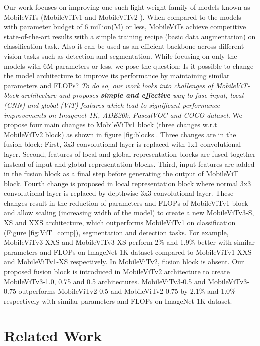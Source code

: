 \documentclass{article} \usepackage{iclr2022_conference,times}
\begin{document}
Our work focuses on improving one such light-weight family of models known as MobileViTs (MobileViTv1 \citep{mehta2021mobilevit} and MobileViTv2 \citep{mehta2022mobilevit}).
When compared to the models with parameter budget of 6 million(M) or less, MobileViTs achieve competitive state-of-the-art results with a simple training recipe (basic data augmentation) on classification task.
Also it can be used as an efficient backbone across different vision tasks such as detection and segmentation.
While focusing on only the models with 6M parameters or less, we pose the question:
Is it possible to change the model architecture to improve its performance by maintaining similar parameters and FLOPs?
\textit{To do so, our work looks into challenges of MobileViT-block architecture and proposes \textbf{simple and effective} way to fuse input, local (CNN) and global (ViT) features which lead to significant performance improvements on Imagenet-1K, ADE20k, PascalVOC and COCO dataset}. 
We propose four main changes to MobileViTv1 block (three changes w.r.t MobileViTv2 block) as shown in figure \ref{fig:blocks}.
Three changes are in the fusion block:
First, 3x3 convolutional layer is replaced with 1x1 convolutional layer.
Second, features of local and global representation blocks are fused together instead of input and global representation blocks. 
Third, input features are added in the fusion block as a final step before generating the output of MobileViT block.
Fourth change is proposed in local representation block where normal 3x3 convolutional layer is replaced by depthwise 3x3 convolutional layer. 
These changes result in the reduction of parameters and FLOPs of MobileViTv1 block and allow scaling (increasing width of the model) to create a new MobileViTv3-S, XS and XXS architecture, which outperforms MobileViTv1 on classification (Figure \ref{fig:ViT_comp}), segmentation and detection tasks.
For example, MobileViTv3-XXS and MobileViTv3-XS perform 2\% and 1.9\% better with similar parameters and FLOPs on ImageNet-1K dataset compared to MobileViTv1-XXS and MobileViTv1-XS respectively.
In MobileViTv2, fusion block is absent. Our proposed fusion block is introduced in MobileViTv2 architecture to create  MobileViTv3-1.0, 0.75 and 0.5 architectures. 
MobileViTv3-0.5 and MobileViTv3-0.75 outperforms MobileViTv2-0.5 and MobileViTv2-0.75 by 2.1\% and 1.0\% respectively with similar parameters and FLOPs on ImageNet-1K dataset.



\section{Related Work}
\end{document}
